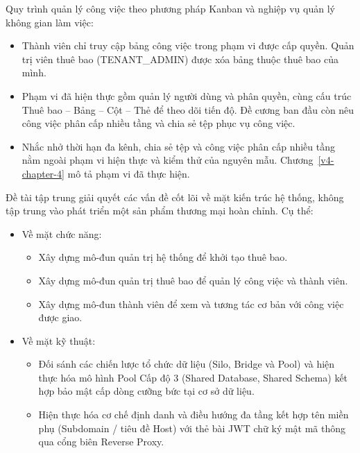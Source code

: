 Quy trình quản lý công việc theo phương pháp Kanban và nghiệp vụ quản lý không gian làm việc:

\begin{itemize}
\item
  Thành viên chỉ truy cập bảng công việc trong phạm vi được cấp quyền. Quản trị viên thuê bao (TENANT\_\allowbreak{}ADMIN) được xóa bảng thuộc thuê bao của mình.
\item
  Phạm vi đã hiện thực gồm quản lý người dùng và phân quyền, cùng cấu trúc Thuê bao -- Bảng -- Cột -- Thẻ để theo dõi tiến độ. Đề cương ban đầu còn nêu công việc phân cấp nhiều tầng và chia sẻ tệp phục vụ công việc.
\item
  Nhắc nhở thời hạn đa kênh, chia sẻ tệp và công việc phân cấp nhiều tầng nằm ngoài phạm vi hiện thực và kiểm thử của nguyên mẫu. Chương~\ref{v4-chapter-4} mô tả phạm vi đã thực hiện.
\end{itemize}

\label{v4-intro-6}

Đề tài tập trung giải quyết các vấn đề cốt lõi về mặt kiến trúc hệ thống, không tập trung vào phát triển một sản phẩm thương mại hoàn chỉnh. Cụ thể:

\begin{itemize}
\item
  Về mặt chức năng:

  \begin{itemize}
  \item
    Xây dựng mô-đun quản trị hệ thống để khởi tạo thuê bao.
  \item
    Xây dựng mô-đun quản trị thuê bao để quản lý công việc và thành viên.
  \item
    Xây dựng mô-đun thành viên để xem và tương tác cơ bản với công việc được giao.
  \end{itemize}
\item
  Về mặt kỹ thuật:

  \begin{itemize}
  \item
    Đối sánh các chiến lược tổ chức dữ liệu (Silo, Bridge và Pool) và hiện thực hóa mô hình Pool Cấp độ 3 (Shared Database, Shared Schema) kết hợp bảo mật cấp dòng cưỡng bức tại cơ sở dữ liệu.
  \item
    Hiện thực hóa cơ chế định danh và điều hướng đa tầng kết hợp tên miền phụ (Subdomain / tiêu đề Host) với thẻ bài JWT chữ ký mật mã thông qua cổng biên Reverse Proxy.
  \end{itemize}
\end{itemize}

